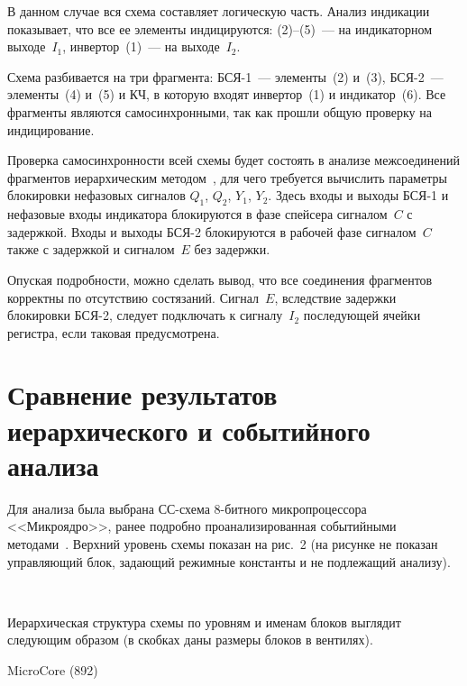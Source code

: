 \begin{multicols}{2}
  В данном случае вся схема составляет логическую часть. Анализ индикации
показывает, что все ее элементы индицируются: (2)--(5)~--- на индикаторном
выходе~$I_1$, инвертор~(1)~--- на выходе~$I_2$.

  Схема разбивается на три фрагмента: БСЯ-1~--- элементы~(2) и~(3),
  БСЯ-2~--- элементы~(4) и~(5) и КЧ, в которую входят инвертор~(1) и
индикатор~(6). Все фрагменты являются самосинхронными, так как прошли
общую проверку на индицирование.

  Проверка самосинхронности всей схемы будет состоять в анализе
межсоединений фрагментов иерархическим методом~\cite{15-p, 16-p}, для чего
требуется вычислить параметры блокировки нефазовых сигналов $Q_1$, $Q_2$,
$Y_1$, $Y_2$. Здесь входы и выходы БСЯ-1 и нефазовые входы индикатора
блокируются в фазе спейсера сигналом~$C$ с задержкой. Входы и выходы
  БСЯ-2 блокируются в рабочей фазе сигналом~$C$ также с задержкой и
сигналом~$E$ без задержки.

  Опуская подробности, можно сделать вывод, что все соединения фрагментов
корректны по отсутствию состязаний. Сигнал~$E$, вследствие задержки
блокировки БСЯ-2, следует подключать к сигналу~$I_2$ последующей ячейки
регистра, если таковая предусмотрена.

\section{Сравнение результатов иерархического и событийного
анализа}

  Для анализа была выбрана СС-схема 8-бит\-но\-го
микропроцессора <<Микроядро>>, ранее подробно проанализированная
событийными методами~\cite{19-p}. Верхний уровень схемы показан на рис.~2
(на рисунке не показан управляющий блок, задающий режимные константы и не
подлежащий анализу).

  \begin{figure*} %
  \vspace*{1pt}
\begin{center}
\mbox{%
\epsfxsize=130.668mm
}
\end{center}
\vspace*{-9pt}
  \end{figure*}

  Иерархическая структура схемы по уровням и именам блоков выглядит
следующим образом (в скобках даны размеры блоков в вентилях).

  \noindent
  MicroCore (892)


\end{multicols}
